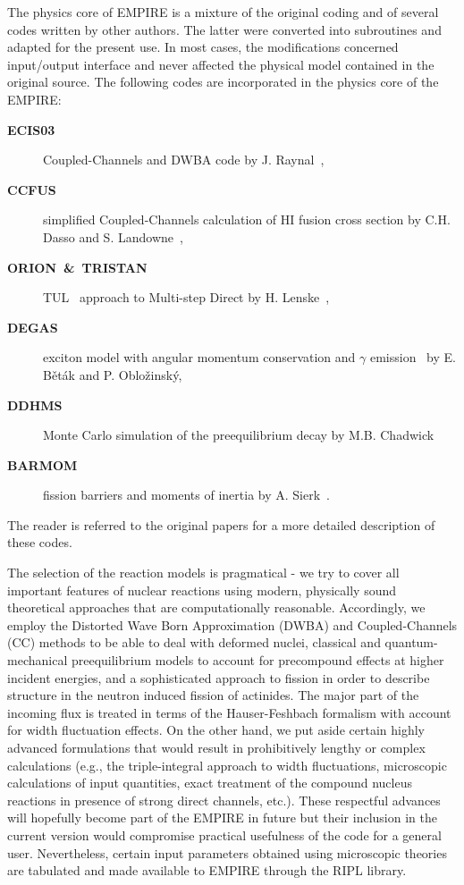 \documentclass[twocolumn,amsmath,amssymb,10pt,groupedaddress,a4paper]{revtex4}
\begin{document}
The physics core of EMPIRE is a mixture of the original coding and of several codes written by other authors. The latter were converted into subroutines and adapted for the present use.
In most cases, the modifications concerned input/output interface
and never affected the physical model contained in the original source.
The following codes are incorporated in the physics core of the EMPIRE:
\begin{description}
\item [\textbf{ECIS03}]Coupled-Channels
and DWBA code by J. Raynal~\cite{ECIS},
\item [\textbf{CCFUS}]simplified Coupled-Channels calculation
of HI fusion cross section by C.H. Dasso and S. Landowne~\cite{CCFUS},
\item [\textbf{ORION~\&~TRISTAN}]TUL~\cite{TUL}
approach to Multi-step Direct by H. Lenske~\cite{ORTRI},
\item [\textbf{DEGAS}]exciton model with angular momentum
conservation and $\gamma$ emission~\cite{Degas} by E. B\v et\' ak
and P. Oblo\v zinsk\' y,
\item [\textbf{DDHMS}]Monte Carlo simulation of the preequilibrium
decay by M.B. Chadwick~\cite{DDHMScode}
\item [\textbf{BARMOM}]fission barriers and moments of inertia
by A. Sierk~\cite{sierk}.
\end{description}
The reader is referred to the original papers for a more detailed description of these codes.

The selection of the reaction models is pragmatical - we try to cover all important features of nuclear reactions using modern, physically sound theoretical approaches  that are computationally reasonable.  Accordingly,
we employ the Distorted Wave Born Approximation (DWBA) and Coupled-Channels (CC) methods to be able to deal with deformed nuclei, classical and quantum-mechanical preequilibrium models to account for precompound effects at higher incident energies, and a sophisticated approach to fission in order to describe structure in the neutron induced fission of actinides. The major part of the incoming flux is treated in terms of the Hauser-Feshbach formalism with account for width fluctuation effects. On the other hand, we put aside certain highly advanced formulations that would result in prohibitively lengthy or complex calculations (e.g., the triple-integral approach to width fluctuations, microscopic calculations of input quantities, exact treatment of the compound nucleus reactions in presence of strong direct channels, etc.). These respectful advances will hopefully become part of the EMPIRE in future but their inclusion in the current version would compromise practical usefulness of the code for a general user. Nevertheless, certain input parameters obtained using microscopic theories  are tabulated and made available to EMPIRE through the RIPL library.
\end{document}
